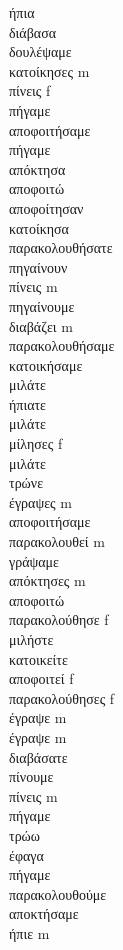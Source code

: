 ήπια  \\ 
διάβασα  \\ 
δουλέψαμε  \\ 
κατοίκησες m \\ 
πίνεις f \\ 
πήγαμε  \\ 
αποφοιτήσαμε  \\ 
πήγαμε  \\ 
απόκτησα  \\ 
αποφοιτώ  \\ 
αποφοίτησαν  \\ 
κατοίκησα  \\ 
παρακολουθήσατε  \\ 
πηγαίνουν  \\ 
πίνεις m \\ 
πηγαίνουμε  \\ 
διαβάζει m \\ 
παρακολουθήσαμε  \\ 
κατοικήσαμε  \\ 
μιλάτε  \\ 
ήπιατε  \\ 
μιλάτε  \\ 
μίλησες f \\ 
μιλάτε  \\ 
τρώνε  \\ 
έγραψες m \\ 
αποφοιτήσαμε  \\ 
παρακολουθεί m \\ 
γράψαμε  \\ 
απόκτησες m \\ 
αποφοιτώ  \\ 
παρακολούθησε f \\ 
μιλήστε  \\ 
κατοικείτε  \\ 
αποφοιτεί f \\ 
παρακολούθησες f \\ 
έγραψε m \\ 
έγραψε m \\ 
διαβάσατε  \\ 
πίνουμε  \\ 
πίνεις m \\ 
πήγαμε  \\ 
τρώω  \\ 
έφαγα  \\ 
πήγαμε  \\ 
παρακολουθούμε  \\ 
αποκτήσαμε  \\ 
ήπιε m \\ 
